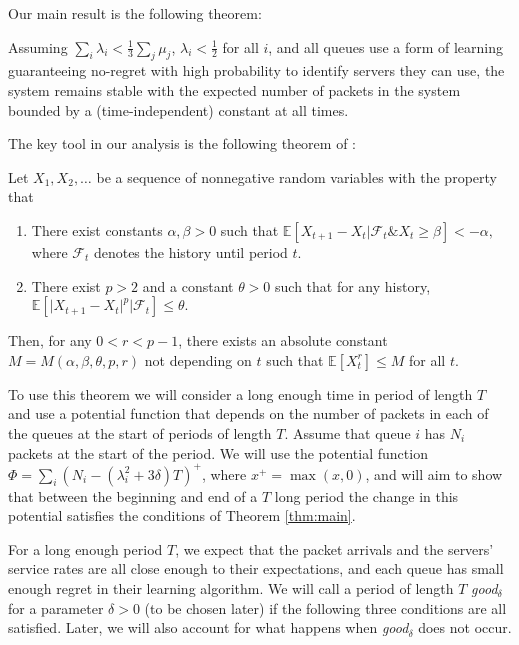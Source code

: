 Our main result is the following theorem:

\begin{theorem}
\label{thm:main}
Assuming $\sum_i\lambda_i < \frac{1}{3} \sum_j \mu_j$, $\lambda_i < \frac12$ for all $i$, and all queues use a form of learning guaranteeing no-regret with high probability to identify servers they can use, the system remains stable with the expected number of packets in the system bounded by a (time-independent) constant at all times. 
\end{theorem}

The key tool in our analysis is the following theorem of \cite{pemantle1999moment}:
\begin{theorem}
\label{thm:pemantle}
Let $X_1,X_2,\ldots$ be a sequence of nonnegative random variables with the property that
\begin{enumerate}
    \item There exist constants $\alpha,\beta>0$ such that  
    $
        \mathbb{E}[X_{t+1}-X_t\vert \mathcal{F}_t \& X_t\ge \beta]<-\alpha,
  $ 
    where $\mathcal{F}_t$
    denotes the history
    until period $t$. 
    
    \item There exist $p>2$ and a constant $\theta>0$ such that for any history, 
   $ 
        \mathbb{E}[\vert X_{t+1}-X_t\vert^p\vert \mathcal{F}_t]\leq \theta.
    $
\end{enumerate}
Then, for any $0<r<p-1$, there exists an absolute constant $M=M(\alpha,\beta,\theta,p,r)$ not depending on $t$ such that $\mathbb{E}[X_t^r]\leq M$ for all $t$.
\end{theorem}
To use this theorem we will consider a long enough time in period of length $T$ and use a potential function that depends on the number of packets in each of the queues at the start of periods of length $T$. Assume that queue $i$ has $N_i$ packets at the start of the period. We will use the potential function $\Phi=\sum_i (N_i-(\lambda^2_i+3\delta) T)^+$, where $x^+=\max(x,0)$, and will aim to show that between the beginning and end of a $T$ long period the change in this potential satisfies the conditions of Theorem \ref{thm:main}. 

For a long enough period $T$, we expect that the packet arrivals and the servers' service rates are all close enough to their expectations, and each queue has small enough regret in their learning algorithm. We will call a period of length $T$ \emph{good}$_\delta$ for a parameter $\delta>0$ (to be chosen later) if the following three conditions are all satisfied. Later, we will also account for what happens when \emph{good}$_\delta$ does not occur. 

